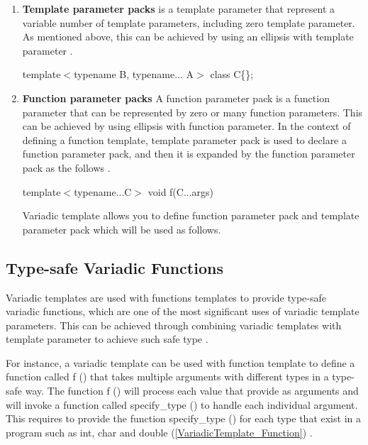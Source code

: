 \documentclass[11pt]{report}
\begin{document}
\begin{enumerate}
\item \textbf{Template parameter packs} is a template parameter that represent a variable number of template parameters, including zero template parameter.  As mentioned above, this can be achieved by using an ellipsis with template parameter \cite{Gregorie:professionalcpp}.
\begin{center}
template$<$typename B, typename... A$>$ class C\{\}; 
\end{center}


\item \textbf{Function parameter packs} A function parameter pack is a function parameter that can be represented by zero or many function parameters. This can be achieved by using ellipsis with function parameter. In the context of defining a function template, template parameter pack is used to declare a function parameter pack, and then it is expanded by the function parameter pack as the follows \cite{Gregorie:professionalcpp}.
\begin{center}
template$<$typename...C$>$ void f(C...args)
\end{center}

Variadic template allows you to define function parameter pack and template parameter pack which will be used as follows.

\end{enumerate}

\subsection{Type-safe Variadic Functions}
Variadic templates are used with functions templates to provide type-safe variadic functions, which are one of the most significant uses of variadic template parameters. This can be achieved through combining variadic templates with template parameter to achieve such safe type \cite{Gregor:2007:VTC}.


For instance, a variadic template can be used with function template to define a function called f () that takes multiple arguments with different types in a type-safe way. The function f () will process each value that provide as arguments and will invoke a function called specify\_type () to handle each individual argument. This requires to provide the function specify\_type () for each type that exist in a program such as int, char and double (\ref{VariadicTemplate_Function}) \cite{Gregorie:professionalcpp}.
\end{document}
